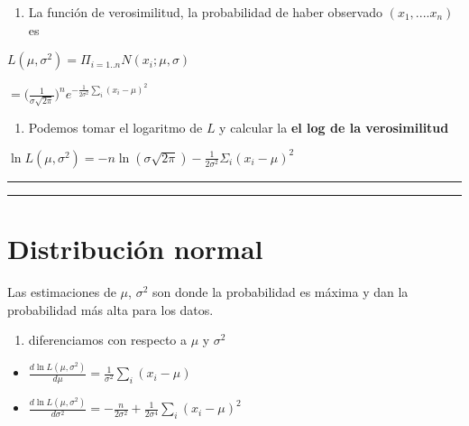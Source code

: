 \documentclass[
]{book}
\providecommand{\tightlist}{%
  \setlength{\itemsep}{0pt}\setlength{\parskip}{0pt}}
\begin{document}
\begin{enumerate}
\def\labelenumi{\arabic{enumi}.}
\tightlist
\item
  La función de verosimilitud, la probabilidad de haber observado \((x_1, ....x_n)\) es
\end{enumerate}

\(L(\mu, \sigma^2)=\Pi_{i=1..n} N(x_i;\mu,\sigma)\)

\(=\big( \frac{1}{\sigma \sqrt{2 \pi}}\big)^n e^{-\frac{1}{2\sigma^2} \sum_i(x_i-\mu)^ 2}\)

\begin{enumerate}
\def\labelenumi{\arabic{enumi}.}
\setcounter{enumi}{1}
\tightlist
\item
  Podemos tomar el logaritmo de \(L\) y calcular la \textbf{el log de la verosimilitud}
\end{enumerate}

\(\ln L(\mu, \sigma^2)=-n \ln(\sigma \sqrt{2 \pi})-\frac{1}{2\sigma^2} \Sigma_i(x_i-\mu) ^2\)

\begin{center}\rule{0.5\linewidth}{0.5pt}\end{center}

\begin{center}\rule{0.5\linewidth}{0.5pt}\end{center}

\hypertarget{distribuciuxf3n-normal-11}{%
\section{Distribución normal}\label{distribuciuxf3n-normal-11}}

Las estimaciones de \(\mu\), \(\sigma^2\) son donde la probabilidad es máxima y dan la probabilidad más alta para los datos.

\begin{enumerate}
\def\labelenumi{\arabic{enumi}.}
\setcounter{enumi}{2}
\tightlist
\item
  diferenciamos con respecto a \(\mu\) y \(\sigma^2\)
\end{enumerate}

\begin{itemize}
\item
  \(\frac{d \ln L(\mu, \sigma^2)}{d\mu}=\frac{1}{\sigma^2} \sum_i(x_i-\mu)\)
\item
  \(\frac{d \ln L(\mu, \sigma^2)}{d\sigma^2}=-\frac{n}{2 \sigma^2}+\frac{1}{2\sigma ^4} \sum_i(x_i-\mu)^2\)
\end{itemize}
\end{document}

